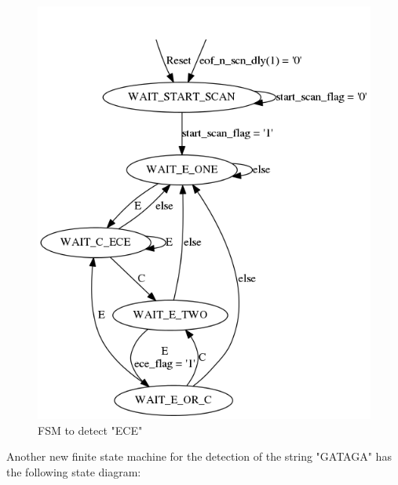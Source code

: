 \documentclass{article}
\begin{document}
	\begin{figure}[H]
		\begin{center}
			\includegraphics[scale=0.35]{../graphviz/part_3_state_diagram_ECE.png}
			\caption{FSM to detect "ECE"}
		\end{center}
	\end{figure}

Another new finite state machine for the detection of the string "GATAGA" has the following state diagram:
\end{document}
